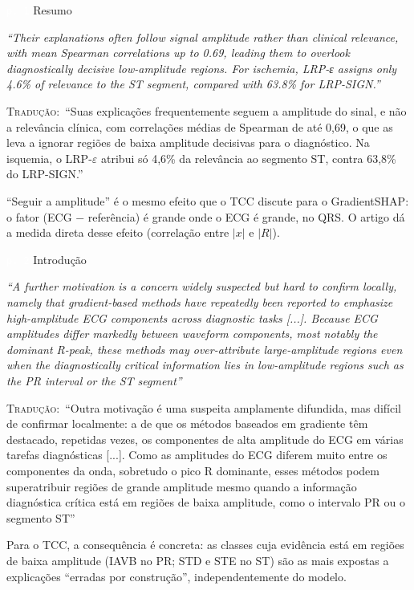 \documentclass[11pt,a4paper]{article}
\newcommand{\pagechip}[1]{{\setlength{\fboxsep}{1.5pt}\colorbox{cAcc}{\textcolor{white}{\scriptsize\texttt{#1}}}}}
\newenvironment{origquote}{\par\itshape\small}{\par}
\newenvironment{tradquote}{\par\small\textsc{Tradução:}\ }{\par}
\newcommand{\explab}[1]{\par\smallskip{\small\color{cAcc}\textbf{\MakeUppercase{#1}}}\par}
\begin{document}
\begin{citacard}{\pagechip{p. 1} Resumo}
\begin{origquote}“Their explanations often follow signal amplitude rather than clinical relevance, with mean Spearman correlations up to 0.69, leading them to overlook diagnostically decisive low-amplitude regions. For ischemia, LRP-ε assigns only 4.6\% of relevance to the ST segment, compared with 63.8\% for LRP-SIGN.”\end{origquote}
\begin{tradquote}“Suas explicações frequentemente seguem a amplitude do sinal, e não a relevância clínica, com correlações médias de Spearman de até 0,69, o que as leva a ignorar regiões de baixa amplitude decisivas para o diagnóstico. Na isquemia, o LRP-$\varepsilon$ atribui só 4,6\% da relevância ao segmento ST, contra 63,8\% do LRP-SIGN.”\end{tradquote}
\explab{Explicação}
“Seguir a amplitude” é o mesmo efeito que o TCC discute para o GradientSHAP: o fator (ECG $-$ referência) é grande onde o ECG é grande, no QRS. O artigo dá a medida direta desse efeito (correlação entre $|x|$ e $|R|$).
\end{citacard}

\begin{citacard}{\pagechip{p. 2} Introdução}
\begin{origquote}“A further motivation is a concern widely suspected but hard to confirm locally, namely that gradient-based methods have repeatedly been reported to emphasize high-amplitude ECG components across diagnostic tasks [...]. Because ECG amplitudes differ markedly between waveform components, most notably the dominant R-peak, these methods may over-attribute large-amplitude regions even when the diagnostically critical information lies in low-amplitude regions such as the PR interval or the ST segment”\end{origquote}
\begin{tradquote}“Outra motivação é uma suspeita amplamente difundida, mas difícil de confirmar localmente: a de que os métodos baseados em gradiente têm destacado, repetidas vezes, os componentes de alta amplitude do ECG em várias tarefas diagnósticas [...]. Como as amplitudes do ECG diferem muito entre os componentes da onda, sobretudo o pico R dominante, esses métodos podem superatribuir regiões de grande amplitude mesmo quando a informação diagnóstica crítica está em regiões de baixa amplitude, como o intervalo PR ou o segmento ST”\end{tradquote}
\explab{Explicação}
Para o TCC, a consequência é concreta: as classes cuja evidência está em regiões de baixa amplitude (IAVB no PR; STD e STE no ST) são as mais expostas a explicações “erradas por construção”, independentemente do modelo.
\end{citacard}
\end{document}
